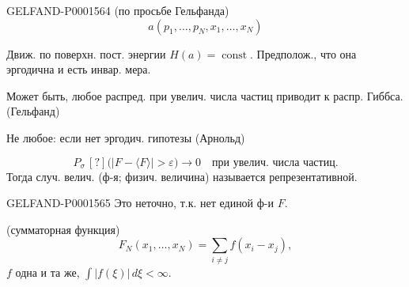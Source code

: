 \begin{GelfandAdjacentEvidence}{GELFAND-P000156}{4}
 (по просьбе Гельфанда)
\begin{equation*}
a(p_1,\ldots,p_N,x_1,\ldots,x_N)
\end{equation*}
\end{GelfandAdjacentEvidence}



Движ. по поверхн. пост. энергии $H(a)=\operatorname{const}$.
Предполож., что она эргодична и есть инвар. мера.

Может быть, любое распред. при увелич. числа частиц
приводит к распр. Гиббса. (Гельфанд)

Не любое: если нет эргодич. гипотезы (Арнольд)
\begin{center}
\end{center}


\begin{equation*}
P_\sigma\,[?]\bigl(|F-\langle F\rangle|>\varepsilon\bigr)\longrightarrow0
\quad\text{при увелич. числа частиц.}
\end{equation*}
Тогда случ. велич. (ф-я; физич. величина) называется
репрезентативной.

\begin{GelfandAdjacentEvidence}{GELFAND-P000156}{5}
Это неточно, т.к. нет единой ф-и $F$.
\end{GelfandAdjacentEvidence}


 (сумматорная функция)
\begin{equation*}
F_N(x_1,\ldots,x_N)=\sum_{i\ne j}f(x_i-x_j),
\end{equation*}
$f$ одна и та же, $\displaystyle\int|f(\xi)|\,d\xi<\infty$.


